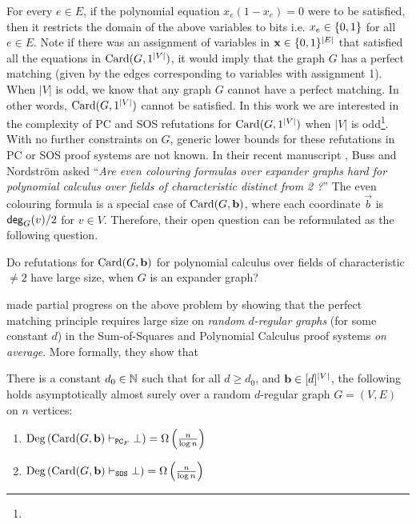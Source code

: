 \documentclass[11pt]{article}
\begin{document}
For every $e \in E$, if the polynomial equation $x_e(1 - x_e) = 0$ were to be satisfied, then it restricts the domain of the above variables to bits i.e. $x_e \in \{0,1\}$ for all $e \in E$.
Note if there was an assignment of variables in $\mathbf{x} \in \{0,1\}^{|E|}$ that satisfied all the equations in $\text{Card}(G, 1^{|V|})$, it would imply that the graph $G$ has a perfect matching (given by the edges corresponding to variables with assignment 1).  
When $|V|$ is odd, we know that any graph $G$ cannot have a perfect matching.
In other words, $\text{Card}(G, 1^{|V|})$ cannot be satisfied.
In this work we are interested in the complexity of PC and SOS refutations for $\text{Card}(G, 1^{|V|})$  when $|V|$ is odd\footnote{}.
With no further constraints on $G$, generic lower bounds for these refutations in PC or SOS proof systems are not known.
In their recent manuscript \citep[Open Problem 7.7]{buss2021proof}, Buss and Nordstr{\"o}m asked ``\textit{Are even colouring formulas over expander graphs hard for
polynomial calculus over fields of characteristic distinct from 2 ?}''
The even colouring formula is a special case of $\text{Card}(G, \mathbf{b})$, where each coordinate  $\vec{b}$ is $\mathsf{deg}_{G}(v)/2$ for $v \in V$.
Therefore, their open question can be reformulated as the following question.

\begin{boxedproblem}\citep[Open Problem 7.7]{buss2021proof}
Do refutations for $\text{Card}(G, \mathbf{b})$ for
polynomial calculus over fields of characteristic $\neq 2$ have large size, when $G$ is an expander graph?
\end{boxedproblem}

\citet{Austrin_2022} made partial progress on the above problem by showing that the perfect matching principle requires large size on \emph{random $d$-regular graphs} (for some constant $d$) in the Sum-of-Squares and Polynomial Calculus proof systems \emph{on average}.
More formally, they show that 

\begin{theorem}\label{thm:prev-thm}
There is a constant $d_0 \in \mathbb{N}$ such that for all $d \geq d_0$, and $\mathbf{b} \in [d]^{\left|V\right|}$, the following holds asymptotically almost surely over a random $d$-regular graph $G=(V,E)$ on $n$ vertices:
\begin{enumerate}
    \item{ $\text{Deg}\left(\text{Card}(G, \mathbf{b}) \vdash_{\texttt{PC}_F} \bot\right) = \Omega\left(\frac{n}{\log n}\right)$} 
    \item{$\text{Deg}\left(\text{Card}(G, \mathbf{b}) \vdash_{\texttt{SOS}} \bot\right) = \Omega\left(\frac{n}{\log n}\right)$}
\end{enumerate}
\end{theorem}
\end{document}
